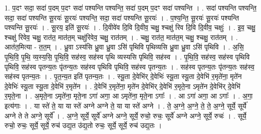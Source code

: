 \documentclass[17pt]{extarticle}
\begin{document}
1. प॒दꣳ सदा॒ सदा॑ प॒दम् प॒दꣳ सदा॑ पश्यन्ति पश्यन्ति॒ सदा॑ प॒दम् प॒दꣳ सदा॑ पश्यन्ति । . सदा॑ पश्यन्ति पश्यन्ति॒ सदा॒ सदा॑ पश्यन्ति सू॒रयः॑ सू॒रयः॑ पश्यन्ति॒ सदा॒ सदा॑ पश्यन्ति सू॒रयः॑ । . प॒श्य॒न्ति॒ सू॒रयः॑ सू॒रयः॑ पश्यन्ति पश्यन्ति सू॒रयः॑ । . सू॒रय॒ इति॑ सू॒रयः॑ । . दि॒वीवे॑व दि॒वि दि॒वीव॒ चक्षु॒ श्चक्षु॑ रिव दि॒वि दि॒वीव॒ चक्षुः॑ । . इ॒व॒ चक्षु॒ श्चक्षु॑ रिवेव॒ चक्षु॒ रात॑त॒ मात॑त॒म् चक्षु॑रिवेव॒ चक्षु॒ रात॑तम् । . चक्षु॒ रात॑त॒ मात॑त॒म् चक्षु॒ श्चक्षु॒ रात॑तम् । . आत॑त॒मित्या - त॒त॒म् । . ध्रु॒वा ऽस्य॑सि ध्रु॒वा ध्रु॒वा ऽसि॑ पृथिवि पृथिव्यसि ध्रु॒वा ध्रु॒वा ऽसि॑ पृथिवि । . अ॒सि॒ पृ॒थि॒वि॒ पृ॒थि॒ व्य॒स्य॒सि॒ पृ॒थि॒वि॒ सह॑स्व॒ सह॑स्व पृथि व्यस्यसि पृथिवि॒ सह॑स्व । . पृ॒थि॒वि॒ सह॑स्व॒ सह॑स्व पृथिवि पृथिवि॒ सह॑स्व पृतन्य॒तः पृ॑तन्य॒तः सह॑स्व पृथिवि पृथिवि॒ सह॑स्व पृतन्य॒तः । . सह॑स्व पृतन्य॒तः पृ॑तन्य॒तः सह॑स्व॒ सह॑स्व पृतन्य॒तः । . पृ॒त॒न्य॒त इति॑ पृतन्य॒तः । . स्यू॒ता दे॒वेभि॑र् दे॒वेभिः॑ स्यू॒ता स्यू॒ता दे॒वेभि॑ र॒मृते॑ना॒ मृते॑न दे॒वेभिः॑ स्यू॒ता स्यू॒ता दे॒वेभि॑ र॒मृते॑न । . दे॒वेभि॑ र॒मृते॑ना॒ मृते॑न दे॒वेभि॑र् दे॒वेभि॑ र॒मृते॒ना ऽमृते॑न दे॒वेभि॑र् दे॒वेभि॑ र॒मृते॒ना । . अ॒मृते॒ना ऽमृते॑ना॒ मृते॒ना ऽगा॑ अगा॒ आ ऽमृते॑ना॒ मृते॒ना ऽगाः᳚ । . आ ऽगा॑ अगा॒ आ ऽगाः᳚ । . अ॒गा॒ इत्य॑गाः । . या स्ते॑ ते॒ या या स्ते॑ अग्ने अग्ने ते॒ या या स्ते॑ अग्ने । . ते॒ अ॒ग्ने॒ अ॒ग्ने॒ ते॒ ते॒ अ॒ग्ने॒ सूर्ये॒ सूर्ये॑ अग्ने ते ते अग्ने॒ सूर्ये᳚ । . अ॒ग्ने॒ सूर्ये॒ सूर्ये॑ अग्ने अग्ने॒ सूर्ये॒ रुचो॒ रुचः॒ सूर्ये॑ अग्ने अग्ने॒ सूर्ये॒ रुचः॑ । . सूर्ये॒ रुचो॒ रुचः॒ सूर्ये॒ सूर्ये॒ रुच॑ उद्य॒त उ॑द्य॒तो रुचः॒ सूर्ये॒ सूर्ये॒ रुच॑ उद्य॒तः । \newline
\end{document}
